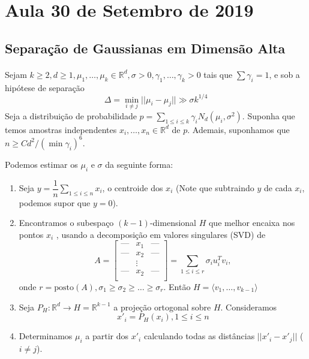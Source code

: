 \section{Aula 30 de Setembro de 2019}
\label{2019_09_30}

\subsection{Separação de Gaussianas em Dimensão Alta}

\paragraph{} Sejam $k\ge 2, d \ge 1, \mu_1,\dots,\mu_k\in \mathbb{R}^d,\sigma >0, \gamma_1,\dots,\gamma_k>0$ tais que $\sum \gamma_i = 1$, e sob a hip\'otese de separa\c{c}\~ao
\[\Delta = \min_{i \neq j}\vert\vert\mu_i-\mu_j\vert\vert\gg \sigma k^{1/4}\]
Seja a distribui\c{c}\~ao de probabilidade $p=\displaystyle \sum_{1\le i\le k}\gamma_i N_d(\mu_i,\sigma^2)$. Suponha que temos amostras independentes $x_i,\dots,x_n \in \mathbb{R}^d$ de $p$. Ademais, suponhamos que $n\ge Cd^2/(\min \gamma_i )^6$.

Podemos estimar os $\mu_i$ e $\sigma$ da seguinte forma:
\begin{enumerate}
\item Seja $y = \dfrac{1}{n}\displaystyle\sum_{1\le i\le n} x_i$, o centroide dos $x_i$ (Note que subtraindo $y$ de cada $x_i$, podemos supor que $y=0$).

\item Encontramos o subespa\c{c}o $(k-1)$-dimensional $H$ que melhor encaixa nos pontos $x_i$ , usando a decomposi\c{c}\~ao em valores singulares (SVD) de 
\[A = 
\begin{bmatrix}
    \text{---} & x_1 & \text{---} \\
    \text{---} & x_2 & \text{---}\\
     &\vdots &\\
    \text{---} & x_2 & \text{---}\\
\end{bmatrix} = \sum_{1\le i \le r} \sigma_iu_i^Tv_i,
\]
onde $r = \text{posto}(A), \sigma_1\ge\sigma_2\ge\dots\ge \sigma_r$.
Ent\~ao $H=\langle v_1,\ldots,v_{k-1} \rangle$

\item Seja $P_H: \mathbb{R}^d \to H=\mathbb{R}^{k-1}$ a proje\c{c}\~ao ortogonal sobre $H$. Consideramos \[x'_i = P_H(x_i), 1\le i \le n\]
\item Determinamos $\mu_i$ a partir dos $x'_i$ calculando todas as dist\^ancias $\vert\vert x'_i-x'_j\vert\vert$ ($i\neq j$).
\end{enumerate}

